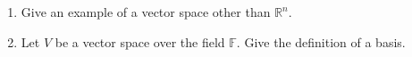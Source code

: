 \begin{enumerate}
	\item Give an example of a vector space other than $\mathbb{R}^n$.
	\item Let $V$ be a vector space over the field $\mathbb{F}$. Give the definition of a basis.
\end{enumerate}
 
